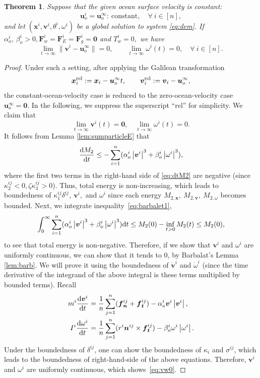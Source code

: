 \documentclass[a4paper,11pt]{article}
\numberwithin{equation}{section}
\newtheorem{theorem}{Theorem}[section]
\theoremstyle{definition}
\newcommand{\bfx}{\boldsymbol{x}}
\newcommand{\bfzr}{\boldsymbol{0}}
\newcommand{\bfv}{\boldsymbol{v}}
\newcommand{\bfn}{\boldsymbol{n}}
\newcommand{\bft}{\boldsymbol{t}}
\newcommand{\bfu}{\boldsymbol{u}_o}
\newcommand{\bff}{\boldsymbol{f}}
\newcommand{\bfF}{\boldsymbol{F}}
\def\d{{  \rm d}}
\begin{document}
\begin{theorem} \label{thm:v0} Suppose that the given ocean surface velocity is constant:
\[  \bfu^i = \bfu^{\infty}:~\mbox{constant}, \quad \forall~i \in [n], \]
and let $(\bfx^i, \bfv^i, \theta^i, \omega^i)$ be a global solution to system \eqref{eq:dem}. 
If $\alpha^i_o,\ \beta^i_o>0, \bfF^i_w=\bfF^i_E=\bfF^i_g=\bfzr$ and $T^i_w=0,$ we have
\[ \lim_{t \to \infty} \|  \bfv^i  -  \bfu^{\infty} \| =0, \quad  \quad \lim_{t \to \infty} \omega^i(t) = 0, \quad \forall~i \in [n].  \]
\end{theorem}
%
\begin{proof} 
Under such a setting, after applying the Galilean transformation
\[
\bfx_i^{\rm rel}:=\bfx_i-\bfu^\infty t,
\qquad
\bfv_i^{\rm rel}:=\bfv_i-\bfu^\infty,
\]
the constant-ocean-velocity case is reduced to the zero-ocean-velocity case
\(\bfu^\infty=\bfzr\).
In the following, we suppress the
superscript ``{\rm rel}'' for simplicity.
We claim that
\begin{equation} \label{eq:vw0}
\lim_{t \to \infty} \bfv^i(t) = \bfzr, \quad \lim_{t \to \infty} \omega^i(t) = 0.
\end{equation}
It follows from Lemma \ref{lem:sumparticleE} that 
\begin{equation}\label{eq:barbalet1}
\frac{\d M_2}{\d t}  \le - \sum_{i=1}^{n} ( \alpha^i_o \left| \bfv^i\right|^3 + \beta^i_o \left| \omega^i\right|^3),
\end{equation}
where the first two terms in the right-hand side of \eqref{eq:dtM2} are negative 
(since $\kappa^{ij}_2 < 0, \zeta\kappa^{ij}_3 > 0$). 
Thus, total energy is non-increasing, which leads to boundedness of $\kappa_1^{ij}\delta^{ij},\ \bfv^i,$ and $\omega^i$ since each energy $M_{2,\bfx},\ M_{2,\bfv},\ M_{2,\omega}$ becomes bounded.
Next, we integrate inequality~\eqref{eq:barbalet1},
\[
\int_0^\infty \sum_{i=1}^n(\alpha^i_o \left| \bfv^i\right|^3 + \beta^i_o \left| \omega^i\right|^3)\d t\le M_2(0)-\inf_{t>0} M_2(t)\le M_2(0),
\]
to see that total energy is non-negative.
Therefore, if we show that $\bfv^i$ and $\omega^i$ are uniformly continuous, we can show that it tends to 0, by Barbalat's Lemma \ref{lem:barb}.
We will prove it using the boundedness of $\dot{\bfv}^i$ and $\dot{\omega}^i$ (since the time derivative of the integrand of the above integral is these terms multiplied by bounded terms).
Recall
\begin{align*}
m^i\frac{\d\bfv^i}{\d t} &=   \frac{1}{n} \sum_{j=1}^{n}(\bff_{\bfn}^{ij} + \bff_{\bft}^{ij}) - \alpha^i_o \bfv^i\left| \bfv^i\right|,\\
I^i\frac{\d\omega^i}{\d t} &= \frac{1}{n} \sum_{j=1}^{n} ( r^i\bfn^{ij}\times \bff_{\bft}^{ij})  - \beta^i_o \omega^i \left|\omega^i \right|.
\end{align*}
Under the boundedness of $\delta^{ij}$, one can show the boundedness of $\kappa_i$ and $\sigma^{ij}$, which leads to the boundedness of right-hand-side of the above equations.
Therefore, $\bfv^i$ and $\omega^i$ are uniformly continuous, which shows~\eqref{eq:vw0}.
\end{proof}
\end{document}
